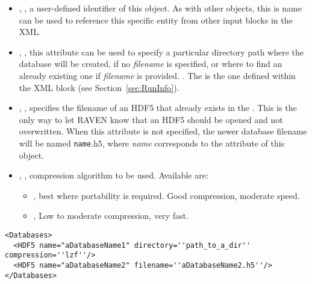 \begin{itemize}
  \itemsep0em
  \item {}, , a user-defined
  identifier of this object.
  \nb As with other objects, this is name can be used to reference this specific
  entity from other input blocks in the XML.
  \item {}, , this attribute
  can be used to specify a particular directory path where the database will be
  created, if no \textit{filename} is specified, or where to find an already
  existing one if \textit{filename} is provided.
  .  The  is
   the one defined within the  XML block (see Section~\ref{sec:RunInfo}).
  \item {}, , specifies the
  filename of an HDF5 that already exists in the .
  This is the only way to let RAVEN know that an HDF5 should be opened and not
  overwritten.
  \nb When this attribute is not specified, the newer database filename will be
  named \texttt{name}.h5, where \textit{name} corresponds to the 
  attribute of this object.
  \item {}, , compression
  algorithm to be used.
  Available are:
  \begin{itemize}
    \item {}, best where portability is required.
    Good compression, moderate speed.
    \item {}, Low to moderate compression, very fast.
  \end{itemize}
\end{itemize}

\begin{lstlisting}[style=XML,morekeywords={directory,filename}]
<Databases>
  <HDF5 name="aDatabaseName1" directory=''path_to_a_dir'' compression=''lzf''/>
  <HDF5 name="aDatabaseName2" filename=''aDatabaseName2.h5''/>
</Databases>
\end{lstlisting}

